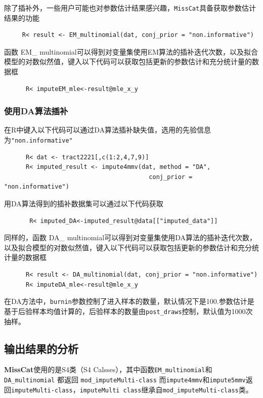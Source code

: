 \documentclass[12pt,hyperref,a4paper,UTF8]{ctexart}
\begin{document}
  除了插补外，一些用户可能也对参数估计结果感兴趣，\texttt{MissCat}具备获取参数估计结果的功能
  \begin{verbatim}
     R< result <- EM_multinomial(dat, conj_prior = "non.informative")
  \end{verbatim} 
函数 EM\_ multinomial可以得到对变量集使用EM算法的插补迭代次数，以及拟合模型的对数似然值，键入以下代码可以获取包括更新的参数估计和充分统计量的数据框
  \begin{verbatim}
      R< imputeEM_mle<-result@mle_x_y
  \end{verbatim}    
  \subsubsection{使用DA算法插补}
  在R中键入以下代码可以通过DA算法插补缺失值，选用的先验信息为\texttt{"non.informative"}
  \begin{verbatim}
      R< dat <- tract2221[,c(1:2,4,7,9)]
      R< imputed_result <- impute4mmv(dat, method = "DA", 
                                        conj_prior = "non.informative")
  \end{verbatim}
  用DA算法得到的插补数据集可以通过以下代码获取
  \begin{verbatim}
       R< imputed_DA<-imputed_result@data[["imputed_data"]]
  \end{verbatim}
  
  同样的，函数 DA\_ multinomial可以得到对变量集使用DA算法的插补迭代次数，以及拟合模型的对数似然值，键入以下代码可以获取包括更新的参数估计和充分统计量的数据框
  \begin{verbatim}
      R< result <- DA_multinomial(dat, conj_prior = "non.informative")
      R< imputeDA_mle<-result@mle_x_y
  \end{verbatim}
  
  在DA方法中，\texttt{burnin}参数控制了进入样本的数量，默认情况下是100.参数估计是基于后验样本均值计算的，后验样本的数量由\texttt{post\_draws}控制，默认值为1000次抽样。
  
  \subsection{输出结果的分析}
  \textbf{MissCat}使用的是S4类（S4 Calsses），其中函数\texttt{EM\_multinomial}和\texttt{DA\_multinomial} 都返回 \texttt{mod\_imputeMulti-class} 
  而\texttt{impute4mmv}和\texttt{impute5mmv}返回\texttt{imputeMulti-class}，\texttt{imputeMulti class}继承自\texttt{mod\_imputeMulti-class}类。
\end{document}
